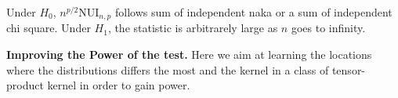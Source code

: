 \begin{prop}
Under $H_0$,
$n^{p/2}\text{NUI}_{n,p}$ follows sum of independent naka or a sum of independent chi square. Under $H_1$, the statistic is arbitrarely large as $n$ goes to infinity.
\end{prop}

\textbf{Improving the Power of the test.} Here we aim at learning the locations where the distributions differs the most and the kernel in a class of tensor-product kernel in order to gain power.


